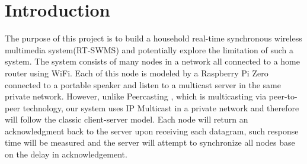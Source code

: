 \section{Introduction}
The purpose of this project is to build a household real-time synchronous wireless multimedia system(RT-SWMS) and potentially explore the limitation of such a system. The system consists of many nodes in a network all connected to a home router using WiFi. Each of this node is modeled by a Raspberry Pi Zero connected to a portable speaker and listen to a multicast server in the same private network. However, unlike Peercasting \cite{Peercasting:1}, which is multicasting via peer-to-peer technology, our system uses IP Multicast in a private network and therefore will follow the classic client-server model. Each node will return an acknowledgment back to the server upon receiving each datagram, such response time will be measured and the server will attempt to synchronize all nodes base on the delay in acknowledgement.